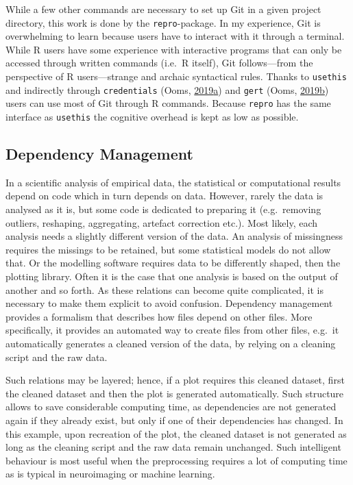 \documentclass[12pt,a4paper,twoside]{article}
\begin{document}
While a few other commands are necessary to set up Git in a given project directory, this work is done by the \texttt{repro}-package.
In my experience, Git is overwhelming to learn because users have to interact with it through a terminal.
While R users have some experience with interactive programs that can only be accessed through written commands (i.e.~R itself), Git follows---from the perspective of R users---strange and archaic syntactical rules.
Thanks to \texttt{usethis} and indirectly through \texttt{credentials} (Ooms, \protect\hyperlink{ref-R-credentials}{2019}\protect\hyperlink{ref-R-credentials}{a}) and \texttt{gert} (Ooms, \protect\hyperlink{ref-R-gert}{2019}\protect\hyperlink{ref-R-gert}{b}) users can use most of Git through R commands.
Because \texttt{repro} has the same interface as \texttt{usethis} the cognitive overhead is kept as low as possible.

\hypertarget{dependency-management}{%
\subsection{Dependency Management}\label{dependency-management}}

In a scientific analysis of empirical data, the statistical or computational results depend on code which in turn depends on data.
However, rarely the data is analysed as it is, but some code is dedicated to preparing it (e.g.~removing outliers, reshaping, aggregating, artefact correction etc.).
Most likely, each analysis needs a slightly different version of the data.
An analysis of missingness requires the missings to be retained, but some statistical models do not allow that.
Or the modelling software requires data to be differently shaped, then the plotting library.
Often it is the case that one analysis is based on the output of another and so forth.
As these relations can become quite complicated, it is necessary to make them explicit to avoid confusion.
Dependency management provides a formalism that describes how files depend on other files.
More specifically, it provides an automated way to create files from other files, e.g.~it automatically generates a cleaned version of the data, by relying on a cleaning script and the raw data.

Such relations may be layered; hence, if a plot requires this cleaned dataset, first the cleaned dataset and then the plot is generated automatically.
Such structure allows to save considerable computing time, as dependencies are not generated again if they already exist, but only if one of their dependencies has changed.
In this example, upon recreation of the plot, the cleaned dataset is not generated as long as the cleaning script and the raw data remain unchanged.
Such intelligent behaviour is most useful when the preprocessing requires a lot of computing time as is typical in neuroimaging or machine learning.
\end{document}
